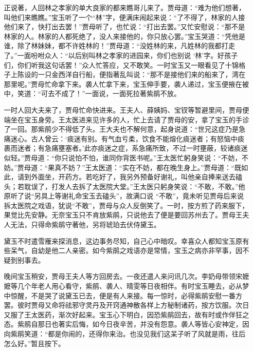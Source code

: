 \begin{parag}
    正说著，人回林之孝家的单大良家的都来瞧哥儿来了。贾母道：“难为他们想著，叫他们来瞧瞧。”宝玉听了一个“林”字，便满床闹起来说：“了不得了，林家的人接他们来了，快打出去罢！”贾母听了，也忙说：“打出去罢。”又忙安慰说：“那不是林家的人。林家的人都死绝了，没人来接他的，你只放心罢。”宝玉哭道：“凭他是谁，除了林妹妹，都不许姓林的！”贾母道：“没姓林的来，凡姓林的我都打走了。”一面吩咐众人：“以后别叫林之孝家的进园来，你们也别说 ‘林’字。好孩子们，你们听我这句话罢！”众人忙答应，又不敢笑。一时宝玉又一眼看见了十锦格子上陈设的一只金西洋自行船，便指著乱叫说：“那不是接他们来的船来了，湾在那里呢。”贾母忙命拿下来。袭人忙拿下来，宝玉伸手要，袭人递过，宝玉便掖在被中，笑道：“可去不成了！”一面说，一面死拉著紫鹃不放。
\end{parag}


\begin{parag}
    一时人回大夫来了，贾母忙命快进来。王夫人、薛姨妈、宝钗等暂避里间，贾母便端坐在宝玉身旁。王太医进来见许多的人，忙上去请了贾母的安，拿了宝玉的手诊了一回。那紫鹃少不得低了头。王大夫也不解何意，起身说道：“世兄这症乃是急痛迷心。古人曾云：‘痰迷有别。有气血亏柔，饮食不能熔化痰迷者；有怒恼中痰裹而迷者；有急痛壅塞者。’此亦痰迷之症，系急痛所致，不过一时壅蔽，较诸痰迷似轻。”贾母道：“你只说怕不怕，谁同你背医书呢。”王太医忙躬身笑说：“不妨，不妨。”贾母道：“果真不妨？”王太医道：“实在不妨，都在晚生身上。”贾母道：“既如此，请到外面坐，开药方。若吃好了，我另外预备好谢礼，叫他亲自捧来送去磕头；若耽误了，打发人去拆了太医院大堂。”王太医只躬身笑说：“不敢，不敢。”他原听了说“另具上等谢礼命宝玉去磕头”，故满口说 “不敢”，竟未听见贾母后来说拆太医院之戏语，犹说“不敢”，贾母与众人反倒笑了。一时，按方煎了药来服下，果觉比先安静。无奈宝玉只不肯放紫鹃，只说他去了便是要回苏州去了。贾母王夫人无法，只得命紫鹃守著他，另将琥珀去伏侍黛玉。
\end{parag}


\begin{parag}
    黛玉不时遣雪雁来探消息，这边事务尽知，自己心中暗叹。幸喜众人都知宝玉原有些呆气，自幼是他二人亲密。如今紫鹃之戏语亦是常情，宝玉之病亦非罕事，因不疑到别事去。
\end{parag}


\begin{parag}
    晚间宝玉稍安，贾母王夫人等方回房去。一夜还遣人来问讯几次。李奶母带领宋嬷嬷等几个年老人用心看守，紫鹃、袭人、晴雯等日夜相伴。有时宝玉睡去，必从梦中惊醒，不是哭了说黛玉已去，便是有人来接。每一惊时，必得紫鹃安慰一番方罢。彼时贾母又命将祛邪守灵丹及开窍通神散各样上方秘制诸药，按方饮服。次日又服了王太医药，渐次好起来。宝玉心下明白，因恐紫鹃回去，故有时或作佯狂之态。紫鹃自那日也著实后悔，如今日夜辛苦，并没有怨意。袭人等皆心安神定，因向紫鹃笑道：“都是你闹的，还得你来治。也没见我们这呆子听了风就是雨，往后怎么好。”暂且按下。
\end{parag}


